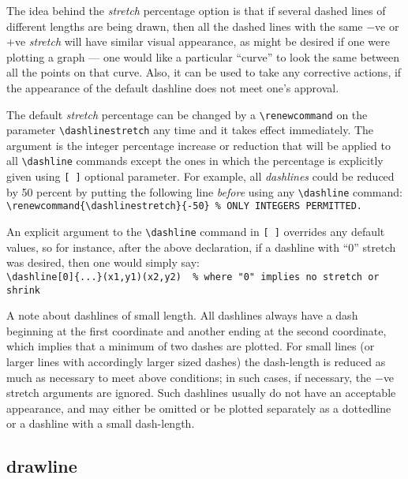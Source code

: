 The idea behind the {\it stretch\/} percentage option is that if several
dashed lines of different lengths are being drawn, then all the dashed lines
with the same $-$ve or $+$ve {\it stretch\/} will have similar visual
appearance, as might be desired if one were plotting a graph --- one would
like a particular ``curve'' to look the same between all the points on that
curve. Also, it can be used to take any corrective actions, if the appearance
of the default dashline does not meet one's approval.

The default {\it stretch\/} percentage can be changed by a
\verb|\renewcommand| on the parameter\linebreak
\verb|\dashlinestretch| any time and it takes effect immediately. The
argument is the integer percentage increase or reduction that will be
applied to all \verb|\dashline| commands except the ones in which the
percentage is explicitly given using \verb|[ ]| optional parameter.
For example, all {\it dashlines\/} could be reduced by 50 percent by
putting the following line {\it before\/} using any \verb|\dashline|
command:\\[2mm]
\hspace*{\leftmargin}
\verb|\renewcommand{\dashlinestretch}{-50} % ONLY INTEGERS PERMITTED.|

An explicit argument to the \verb|\dashline| command in \verb|[ ]|
overrides any default values, so for instance, after the above declaration,
if a dashline with ``0'' stretch was desired,
then one would simply say:\\[2mm]
\hspace*{\leftmargin}\verb|\dashline[0]{...}(x1,y1)(x2,y2)  % where "0" implies no stretch or shrink|

A note about dashlines of small length. All dashlines always have a dash
beginning at the first coordinate and another ending at the second
coordinate, which implies that a minimum of two dashes are plotted. For small
lines (or larger lines with accordingly larger sized dashes) the dash-length
is reduced as much as necessary to meet above conditions; in such cases, if
necessary, the $-$ve stretch arguments are ignored. Such dashlines
usually do not have an acceptable appearance, and may either be omitted or be
plotted separately as a dottedline or a dashline with a small dash-length.

\subsection{{\tt \bs}drawline}

